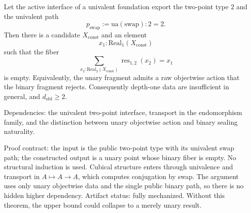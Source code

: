 \documentclass{lmcs}
\newcommand{\Real}{\mathrm{Real}}
\newcommand{\res}{\operatorname{res}}
\begin{document}
\begin{thm}
\label{thm:swap-obstruction}
Let the active interface of a univalent foundation export the two-point type \(2\) and the
univalent path
\[
  p_{\mathrm{swap}} := \mathrm{ua}(\mathrm{swap}) : 2 = 2.
\]
Then there is a candidate \(X_{\mathrm{const}}\) and an element
\[
  x_1:\Real_1(X_{\mathrm{const}})
\]
such that the fiber
\[
  \sum_{x_2:\Real_2(X_{\mathrm{const}})}
  \res_{1,2}(x_2)=x_1
\]
is empty.  Equivalently, the unary fragment admits a raw objectwise action that the binary
fragment rejects.  Consequently depth-one data are insufficient in general, and
\(d_{\mathrm{obl}}\geq 2\).

Dependencies: the univalent two-point interface, transport in the endomorphism family, and
the distinction between unary objectwise action and binary sealing naturality.

Proof contract: the input is the public two-point type with its univalent swap
path; the constructed output is a unary point whose binary fiber is empty.  No
structural induction is used.  Cubical structure enters through univalence and
transport in \(A\mapsto A\to A\), which computes conjugation by swap.  The
argument uses only unary objectwise data and the single public binary path, so
there is no hidden higher dependency.  Artifact status: fully mechanized.
Without this theorem, the upper bound could collapse to a merely unary result.
\end{thm}
\end{document}
